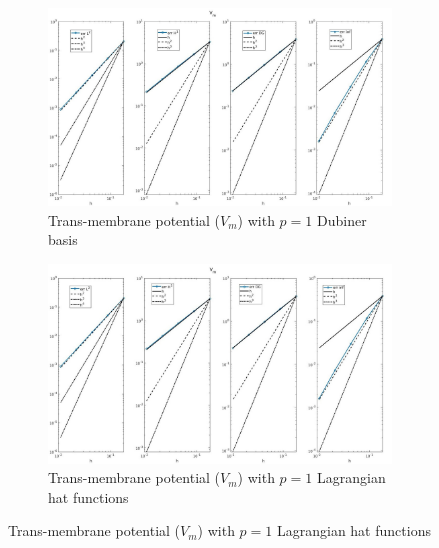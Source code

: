 \documentclass[a4paper,11pt]{article}
\begin{document}
\begin{figure}[H]
\caption{Comparison of the trans-membrane potential ($V_m$)}
\label{Vm_1}
\begin{subfigure}{\textwidth}
\begin{center}
\includegraphics[width = \textwidth]{./errors/D1_Vm_1.jpg}
\caption{Trans-membrane potential ($V_m$) with $p=1$ Dubiner basis}
\end{center}
\end{subfigure}
\begin{subfigure}{\textwidth}
\begin{center}
\includegraphics[width =\textwidth]{./errors/P1_Vm_1.jpg}
\caption{Trans-membrane potential ($V_m$) with $p=1$ Lagrangian hat functions}
\end{center}
\end{subfigure}
\end{figure}
\end{document}
